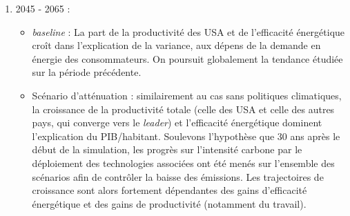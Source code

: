 \documentclass[a4,11pt]{aleph-notas}
\begin{document}
\begin{enumerate}
\begin{itemize}
    \end{itemize}
    \item 2045 - 2065 :
    \begin{itemize}
        \item \textit{baseline} : La part de la productivité des USA et de l'efficacité énergétique croît dans l'explication de la variance, aux dépens de la demande en énergie des consommateurs. On poursuit globalement la tendance étudiée sur la période précédente.
        \item Scénario d'atténuation : similairement au cas sans politiques climatiques, la croissance de la productivité totale (celle des USA et celle des autres pays, qui converge vers le \textit{leader}) et l'efficacité énergétique dominent l'explication du PIB/habitant. Soulevons l'hypothèse que 30 ans après le début de la simulation, les progrès sur l'intensité carbone par le déploiement des technologies associées ont été menés sur l'ensemble des scénarios afin de contrôler la baisse des émissions. Les trajectoires de croissance sont alors fortement dépendantes des gains d'efficacité énergétique et des gains de productivité (notamment du travail).
    \end{itemize}
\end{enumerate}
\end{document}
